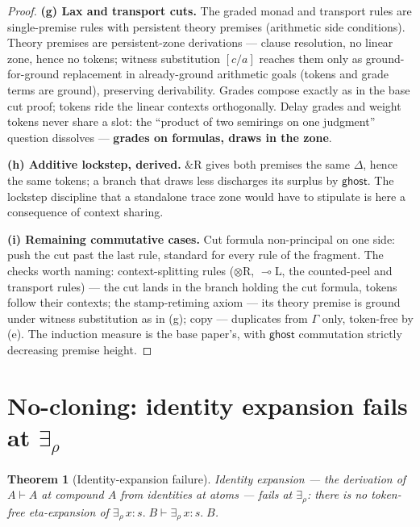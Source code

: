 \documentclass[11pt]{article}
\newcommand{\loli}{\multimap}                    %
\newcommand{\tensor}{\otimes}                    %
\newcommand{\addconj}{\mathbin{\&}}              %
\newcommand{\erho}[2]{\exists_{\rho}\, #1{:}#2.\;} %
\newcommand{\ghost}{\mathsf{ghost}}
\newtheorem{theorem}{Theorem}[section]
\theoremstyle{definition}
\theoremstyle{remark}
\begin{document}
\begin{proof}
\medskip\noindent\textbf{(g) Lax and transport cuts.}  The graded
monad and transport rules are single-premise rules with persistent
theory premises (arithmetic side conditions).  Theory premises are
persistent-zone derivations --- clause resolution, no linear zone,
hence no tokens; witness substitution $[c/a]$ reaches them only as
ground-for-ground replacement in already-ground arithmetic goals
(tokens and grade terms are ground), preserving derivability.  Grades
compose exactly as in the base cut proof; tokens ride the linear
contexts orthogonally.  Delay grades and weight tokens never share a
slot: the ``product of two semirings on one judgment'' question
dissolves --- \textbf{grades on formulas, draws in the zone}.

\medskip\noindent\textbf{(h) Additive lockstep, derived.}
$\addconj$R gives both premises the same $\Delta$, hence the same
tokens; a branch that draws less discharges its surplus by $\ghost$.
The lockstep discipline that a standalone trace zone would have to
stipulate is here a consequence of context sharing.

\medskip\noindent\textbf{(i) Remaining commutative cases.}  Cut
formula non-principal on one side: push the cut past the last rule,
standard for every rule of the fragment.  The checks worth naming:
context-splitting rules ($\tensor$R, $\loli$L, the counted-peel and
transport rules) --- the cut lands in the branch holding the cut
formula, tokens follow their contexts; the stamp-retiming axiom ---
its theory premise is ground under witness substitution as in (g);
copy --- duplicates from $\Gamma$ only, token-free by (e).  The
induction measure is the base paper's, with $\ghost$ commutation
strictly decreasing premise height.
\end{proof}

\section{No-cloning: identity expansion fails at \texorpdfstring{$\exists_\rho$}{the weighted existential}}
\label{sec:nocloning}

\begin{theorem}[Identity-expansion failure]\label{thm:nocloning}
Identity expansion --- the derivation of $A \vdash A$ at compound $A$
from identities at atoms --- fails at $\exists_\rho$: there is no
token-free eta-expansion of
$\erho{x}{s}B \vdash \erho{x}{s}B$.
\end{theorem}
\end{document}

